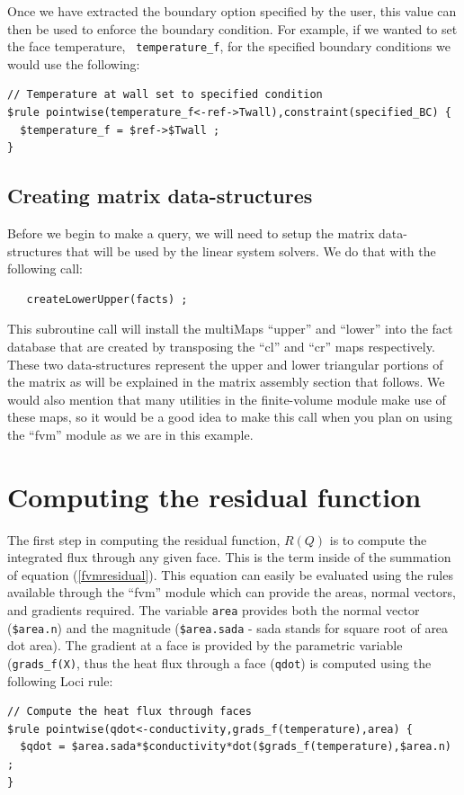 \documentclass[10pt,epsf,letterpaper,twoside]{book}
\begin{document}
Once we have extracted the boundary option specified by the user, this
value can then be used to enforce the boundary condition.  For
example, if we wanted to set the face temperature, {\tt
  temperature\_f}, for the specified boundary conditions we would use
the following:
\begin{verbatim}
// Temperature at wall set to specified condition
$rule pointwise(temperature_f<-ref->Twall),constraint(specified_BC) {
  $temperature_f = $ref->$Twall ;
}
\end{verbatim}

\subsection{ Creating matrix data-structures}

Before we begin to make a query, we will need to setup the matrix data-structures that will be used by the linear system solvers.  We do that with the following call:
\begin{verbatim}
   createLowerUpper(facts) ;
\end{verbatim}
This subroutine call will install the multiMaps ``upper'' and
``lower'' into the fact database that are created by transposing the
``cl'' and ``cr'' maps respectively.  These two data-structures
represent the upper and lower triangular portions of the matrix as
will be explained in the matrix assembly section that follows.  We
would also mention that many utilities in the finite-volume module
make use of these maps, so it would be a good idea to make this call
when you plan on using the ``fvm'' module as we are in this example.


\section{Computing the residual function}

The first step in computing the residual function, $R(Q)$ is to
compute the integrated flux through any given face.  This is the term
inside of the summation of equation (\ref{fvmresidual}).  This
equation can easily be evaluated using the rules available through the
``fvm'' module which can provide the areas, normal vectors, and
gradients required.  The variable {\tt area} provides both the normal
vector ({\tt \$area.n}) and the magnitude ({\tt \$area.sada} - sada
stands for square root of area dot area).  The gradient at a face is
provided by the parametric variable ({\tt grads\_f(X)}, thus the heat
flux through a face ({\tt qdot}) is computed using the following Loci rule:
\begin{verbatim}
// Compute the heat flux through faces
$rule pointwise(qdot<-conductivity,grads_f(temperature),area) {
  $qdot = $area.sada*$conductivity*dot($grads_f(temperature),$area.n) ;
}
\end{verbatim}
\end{document}
